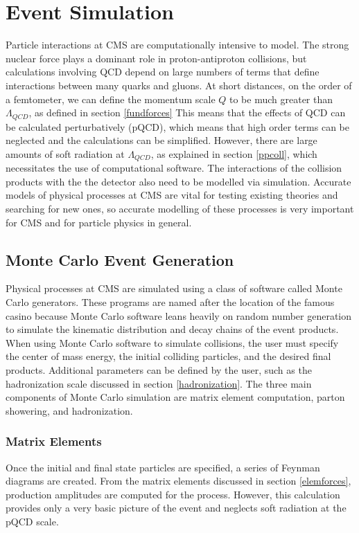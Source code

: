 \documentclass[oneside, letterpaper, oldfontcommands]{memoir}
\begin{document}
\chapter{Event Simulation}\label{eventsim}
\qquad Particle interactions at CMS are computationally intensive to model. The strong nuclear force plays a dominant role in proton-antiproton collisions, but calculations involving QCD depend on large numbers of terms 
that define interactions between many quarks and gluons. At short distances, on the order of a femtometer, we can define the momentum scale $Q$ to be much greater than $\Lambda_{QCD}$, as defined in section \ref{fundforces}  This means that the effects of QCD can be calculated perturbatively (pQCD), which means that high order terms can be neglected and the calculations can be simplified. However, there are large amounts of soft radiation at $\Lambda_{QCD}$, as explained in section \ref{ppcoll}, which necessitates the use of computational software.
\qquad The interactions of the collision products with the the detector also need to be modelled via simulation. Accurate models of physical processes at CMS are vital for testing existing theories and searching for new ones, so accurate modelling of these processes is very important for CMS and for particle physics in general.
   
\section{Monte Carlo Event Generation}\label{mcgen}
\qquad Physical processes at CMS are simulated using a class of software called Monte Carlo generators. These programs are named after the location of the famous casino because Monte Carlo software leans heavily on random number generation to simulate the kinematic distribution and decay chains of the event products. When using Monte Carlo software to simulate collisions, the user must specify the center of mass energy, the initial colliding particles, and the desired final products. Additional parameters can be defined by the user, such as the hadronization scale discussed in section \ref{hadronization}.  The three main components of Monte Carlo simulation are matrix element computation, parton showering, and hadronization. 


\subsection{Matrix Elements}\label{matrix}

\qquad  Once the initial and final state particles are specified, a series of Feynman diagrams are created. From the matrix elements discussed in section \ref{elemforces}, production amplitudes are computed for the process.
However, this calculation provides only a very basic picture of the event and neglects soft radiation at the pQCD scale. 
\end{document}
